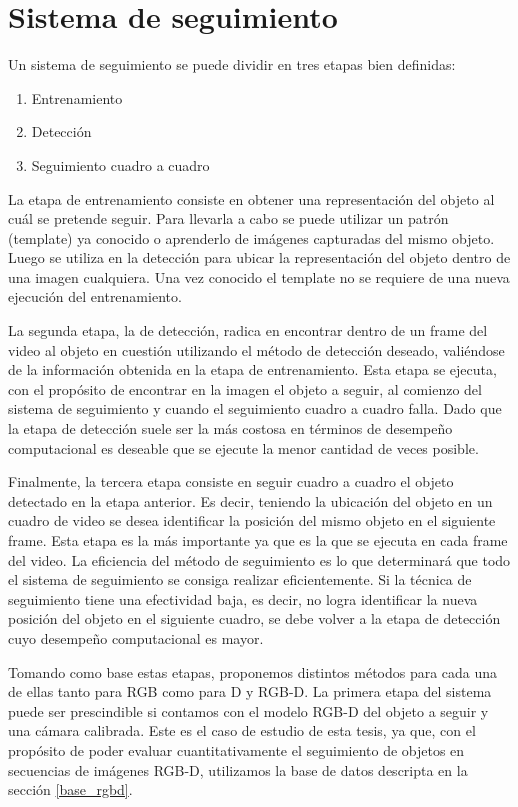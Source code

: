 \chapter{Sistema de seguimiento}

Un sistema de seguimiento se puede dividir en tres etapas bien definidas:
\begin{enumerate}
 \item Entrenamiento
 \item Detección
 \item Seguimiento cuadro a cuadro
\end{enumerate}

La etapa de entrenamiento consiste en obtener una representación del objeto al cuál se pretende seguir. Para llevarla a cabo se puede utilizar un patrón (template) ya conocido o aprenderlo de imágenes capturadas del mismo objeto. Luego se utiliza en la detección para ubicar la representación del objeto dentro de una imagen cualquiera. Una vez conocido el template no se requiere de una nueva ejecución del entrenamiento.

La segunda etapa, la de detección, radica en encontrar dentro de un frame del video al objeto en cuestión utilizando el método de detección deseado, valiéndose de la información obtenida en la etapa de entrenamiento. Esta etapa se ejecuta, con el propósito de encontrar en la imagen el objeto a seguir, al comienzo del sistema de seguimiento y cuando el seguimiento cuadro a cuadro falla. Dado que la etapa de detección suele ser la más costosa en términos de desempeño computacional es deseable que se ejecute la menor cantidad de veces posible.

Finalmente, la tercera etapa consiste en seguir cuadro a cuadro el objeto detectado en la etapa anterior. Es decir, teniendo la ubicación del objeto en un cuadro de video se desea identificar la posición del mismo objeto en el siguiente frame. Esta etapa es la más importante ya que es la que se ejecuta en cada frame del video. La eficiencia del método de seguimiento es lo que determinará que todo el sistema de seguimiento se consiga realizar eficientemente. Si la técnica de seguimiento tiene una efectividad baja, es decir, no logra identificar la nueva posición del objeto en el siguiente cuadro, se debe volver a la etapa de detección cuyo desempeño computacional es mayor.

Tomando como base estas etapas, proponemos distintos métodos para cada una de ellas tanto para RGB como para D y RGB-D. La primera etapa del sistema puede ser prescindible si contamos con el modelo RGB-D del objeto a seguir y una cámara calibrada. Este es el caso de estudio de esta tesis, ya que, con el propósito de poder evaluar cuantitativamente el seguimiento de objetos en secuencias de imágenes RGB-D, utilizamos la base de datos descripta en la sección \ref{base_rgbd}.

